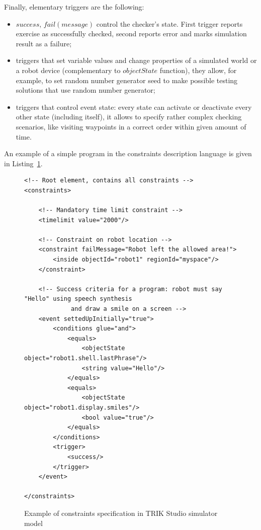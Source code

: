 \documentclass[conference]{IEEEtran}
\begin{document}
Finally, elementary triggers are the following:
\begin{itemize}
    \item $success$, $fail(message)$ control the checker's state. First trigger reports exercise as successfully checked, second reports error and marks simulation result as a failure;
    \item triggers that set variable values and change properties of a simulated world or a robot device (complementary to $objectState$ function), they allow, for example, to set random number generator seed to make possible testing solutions that use random number generator;
    \item triggers that control event state: every state can activate or deactivate every other state (including itself), it allows to specify rather complex checking scenarios, like visiting waypoints in a correct order within given amount of time.
\end{itemize}

An example of a simple program in the constraints description language is given in Listing~\ref{code:constraints}.

\captionsetup[figure]{name=Listing}
\setcounter{figure}{0}

\begin{figure}[!t]
\begin{verbatim}
<!-- Root element, contains all constraints -->
<constraints>

    <!-- Mandatory time limit constraint -->
    <timelimit value="2000"/>

    <!-- Constraint on robot location -->
    <constraint failMessage="Robot left the allowed area!">
        <inside objectId="robot1" regionId="myspace"/>
    </constraint>

    <!-- Success criteria for a program: robot must say "Hello" using speech synthesis 
		     and draw a smile on a screen -->
    <event settedUpInitially="true">
        <conditions glue="and">
            <equals>
                <objectState object="robot1.shell.lastPhrase"/>
                <string value="Hello"/>
            </equals>
            <equals>
                <objectState object="robot1.display.smiles"/>
                <bool value="true"/>
            </equals>
        </conditions>
        <trigger>
            <success/>
        </trigger>
    </event>

</constraints>
\end{verbatim}
\caption{Example of constraints specification in TRIK Studio simulator model}
\label{code:constraints}
\end{figure}
\end{document}
